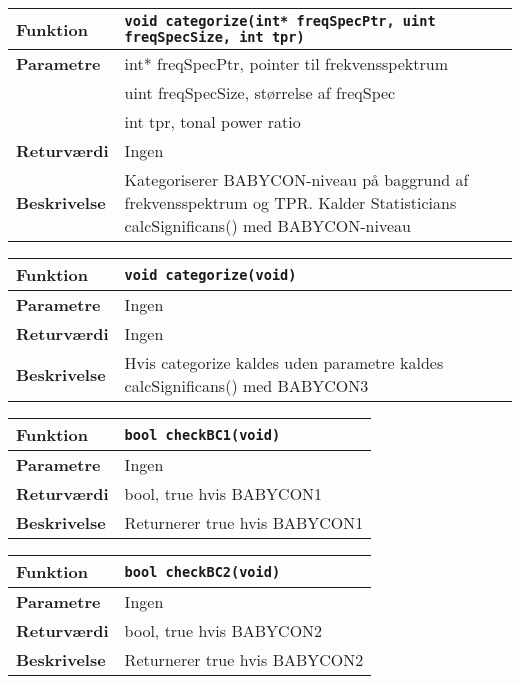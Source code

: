 \begin{center}
    \begin{tabular}{ | l | p{} |}
    \hline
    \textbf{Funktion}	& \verb+void categorize(int* freqSpecPtr, uint freqSpecSize, int tpr) +						\\ \hline
    \textbf{Parametre} 	& int* freqSpecPtr, pointer til frekvensspektrum \\
    					& uint freqSpecSize, størrelse af freqSpec \\
    					& int tpr, tonal power ratio	\\ \hline
    \textbf{Returværdi}	& Ingen	 								\\ \hline
    \textbf{Beskrivelse}& Kategoriserer BABYCON-niveau på baggrund af frekvensspektrum og TPR. Kalder Statisticians calcSignificans() med BABYCON-niveau		\\ \hline
    \end{tabular}
\end{center}

\begin{center}
    \begin{tabular}{ | l | p{} |}
    \hline
    \textbf{Funktion}	& \verb+void categorize(void) +						\\ \hline
    \textbf{Parametre} 	& Ingen 								\\ \hline
    \textbf{Returværdi}	& Ingen	 								\\ \hline
    \textbf{Beskrivelse}& Hvis categorize kaldes uden parametre kaldes calcSignificans() med BABYCON3		\\ \hline
    \end{tabular}
\end{center}

\begin{center}
    \begin{tabular}{ | l | p{} |}
    \hline
    \textbf{Funktion}	& \verb+bool checkBC1(void) +						\\ \hline
    \textbf{Parametre} 	& Ingen 								\\ \hline
    \textbf{Returværdi}	& bool, true hvis BABYCON1 	 								\\ \hline
    \textbf{Beskrivelse}& Returnerer true hvis BABYCON1		\\ \hline
    \end{tabular}
\end{center}

\begin{center}
    \begin{tabular}{ | l | p{} |}
    \hline
    \textbf{Funktion}	& \verb+bool checkBC2(void) +						\\ \hline
    \textbf{Parametre} 	& Ingen 								\\ \hline
    \textbf{Returværdi}	& bool, true hvis BABYCON2 	 								\\ \hline
    \textbf{Beskrivelse}& Returnerer true hvis BABYCON2		\\ \hline
    \end{tabular}
\end{center}




